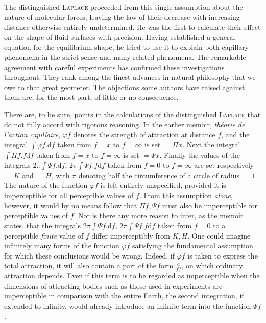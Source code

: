The distinguished \textsc{Laplace} proceeded from this single assumption about the nature of molecular forces, leaving the law of their decrease with increasing distance otherwise entirely undetermined. He was the first to calculate their effect on the shape of fluid surfaces with precision. Having established a general equation for the equilibrium shape, he tried to use it to explain both capillary phenomena in the strict sense and many related phenomena. The remarkable agreement with careful experiments has confirmed these investigations throughout. They rank among the finest advances in natural philosophy that we owe to that great geometer. The objections some authors have raised against them are, for the most part, of little or no consequence.

There are, to be sure, points in the calculations of the distinguished \textsc{Laplace} that do not fully accord with rigorous reasoning. In the earlier memoir, \textit{théorie de l’action capillaire}, $\varphi f$ denotes the strength of attraction at distance $f$, and the integral $\int\varphi f.\mathrm{d}f$ taken from $f=x$ to $f=\infty$ is set $=\Pi x$. Next the integral $\int\Pi f.f\mathrm{d}f$ taken from $f=x$ to $f=\infty$ is set $=\Psi x$. Finally the values of the integrals $2\pi\int\Psi f.\mathrm{d}f$, $2\pi\int\Psi f.f\mathrm{d}f$ taken from $f=0$ to $f=\infty$ are set respectively $=K$ and $=H$, with $\pi$ denoting half the circumference of a circle of radius $=1$. The nature of the function $\varphi f$ is left entirely unspecified, provided it is imperceptible for all perceptible values of $f$. From this assumption \textit{alone}, however, it would by no means follow that $\Pi f,\Psi f$ must also be imperceptible for perceptible values of $f$. Nor is there any more reason to infer, as the memoir states, that the integrals $2\pi\int\Psi f.\mathrm{d}f$, $2\pi\int\Psi f.f\mathrm{d}f$ taken from $f=0$ to a perceptible \textit{finite} value of $f$ differ imperceptibly from $K,H$. One could imagine infinitely many forms of the function $\varphi f$ satisfying the fundamental assumption for which these conclusions would be wrong. Indeed, if $\varphi f$ is taken to express the total attraction, it will also contain a part of the form $\frac{a}{ff}$, on which ordinary attraction depends. Even if this term is to be regarded as imperceptible when the dimensions of attracting bodies such as those used in experiments are imperceptible in comparison with the entire Earth, the second integration, if extended to infinity, would already introduce an infinite term into the function $\Psi f$.

